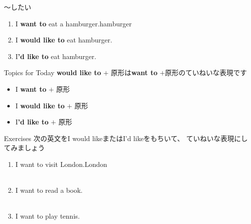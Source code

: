 \documentclass[aspectratio=169,xcolor={dvipsnames,table}]{beamer}
\begin{document}
\begin{frame}[plain]{～したい}
\large
 \begin{enumerate}
  \item I \textbf{want to} eat a hamburger.\hfill{\scriptsize hamburger }
  \item I \textbf{would like to} eat hamburger.
  \item I{\bfseries 'd like to} eat hamburger.
 \end{enumerate}

\begin{block}{Topics for Today}\small
\textbf{would like to} $+$ 原形は\textbf{want to} $+$原形のていねいな表現です
\begin{itemize}[square]\small
 \item I \textbf{want to} $+$ 原形
 \item I \textbf{would like to} $+$ 原形
 \item I\textbf{'d like to} $+$ 原形
       \end{itemize}
\end{block}

\hfill{\scriptsize {}}

\end{frame}
\begin{frame}[plain]{Exercises}
次の英文をI would likeまたはI'd likeをもちいて、 ていねいな表現にしてみましょう
 \begin{enumerate}
  \item I want to visit London.\hfill{\scriptsize London }\\
\\
  \item I want to read a book.\\
\\
  \item I want to play tennis.\\
\\
 \end{enumerate}
\hfill{\scriptsize {}}

\end{frame}
\end{document}

